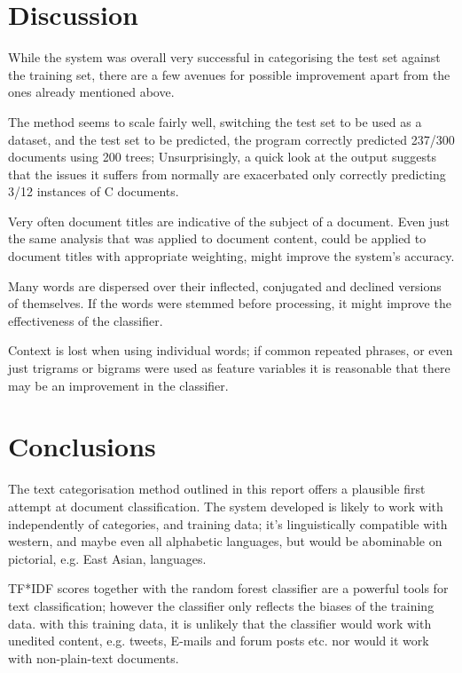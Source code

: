 \documentclass[11pt]{article}
\begin{document}
\section{Discussion}

While the system was overall very successful in categorising the test set
against the training set, there are a few avenues for possible improvement
apart from the ones already mentioned above.

The method seems to scale fairly well, switching the test set to be used as a
dataset, and the test set to be predicted, the program correctly predicted
237/300 documents using 200 trees; Unsurprisingly, a quick look at the output
suggests that the issues it suffers from normally are exacerbated only
correctly predicting 3/12 instances of C documents.

Very often document titles are indicative of the subject of a document. Even
just the same analysis that was applied to document content, could be applied
to document titles with appropriate weighting, might improve the system's
accuracy.

Many words are dispersed over their inflected, conjugated and declined
versions of themselves. If the words were stemmed before processing, it might
improve the effectiveness of the classifier.

Context is lost when using individual words; if common repeated phrases, or even
just trigrams or bigrams were used as feature variables it is reasonable that
there may be an improvement in the classifier.

\section{Conclusions}

The text categorisation method outlined in this report offers a plausible first
attempt at document classification. The system developed is likely to work with
independently of categories, and training data; it's linguistically compatible
with western, and maybe even all alphabetic languages, but would be abominable
on pictorial, e.g. East Asian, languages. 

TF*IDF scores together with the random forest classifier are a powerful tools
for text classification; however the classifier only reflects the biases of the
training data. with this training data, it is unlikely that the classifier
would work with unedited content, e.g.  tweets, E-mails and forum posts etc.
nor would it work with non-plain-text documents.



\nocite{*}
\end{document}
